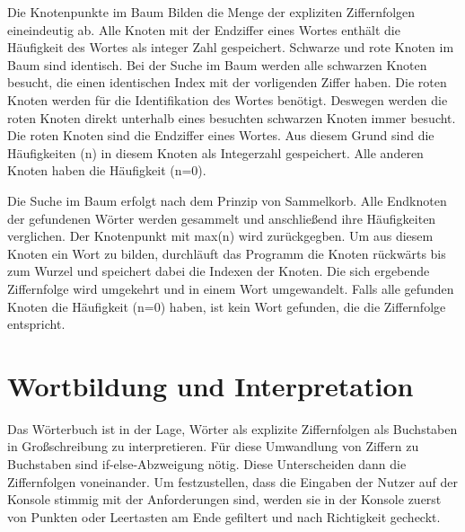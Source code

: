 Die Knotenpunkte im Baum Bilden die Menge der expliziten Ziffernfolgen eineindeutig ab. Alle Knoten mit der Endziffer eines Wortes enthält die Häufigkeit des Wortes als integer Zahl gespeichert.
Schwarze und rote Knoten im Baum sind identisch.
Bei der Suche im Baum werden alle schwarzen Knoten besucht, die einen identischen Index mit der vorligenden Ziffer haben. Die roten Knoten werden für die Identifikation des Wortes benötigt. Deswegen werden die roten Knoten direkt unterhalb eines besuchten schwarzen Knoten immer besucht. Die roten Knoten sind die Endziffer eines Wortes. Aus diesem Grund sind die Häufigkeiten (n) in diesem Knoten als Integerzahl gespeichert. Alle anderen Knoten haben die Häufigkeit (n=0).

Die Suche im Baum erfolgt nach dem Prinzip von Sammelkorb. Alle Endknoten der gefundenen Wörter werden gesammelt und anschließend ihre Häufigkeiten verglichen. Der Knotenpunkt mit max(n) wird zurückgegben.
Um aus diesem Knoten ein Wort zu bilden, durchläuft das Programm die Knoten rückwärts bis zum Wurzel und speichert dabei die Indexen der Knoten. Die sich ergebende Ziffernfolge wird umgekehrt und in einem Wort umgewandelt.
Falls alle gefunden Knoten die Häufigkeit (n=0) haben, ist kein Wort gefunden, die die Ziffernfolge entspricht.

\section{Wortbildung und Interpretation}
Das Wörterbuch ist in der Lage, Wörter als explizite Ziffernfolgen als Buchstaben in Großschreibung zu interpretieren.
Für diese Umwandlung von Ziffern zu Buchstaben sind if-else-Abzweigung nötig. Diese Unterscheiden dann die Ziffernfolgen voneinander.
Um festzustellen, dass die Eingaben der Nutzer auf der Konsole stimmig mit der Anforderungen sind, werden sie in der Konsole zuerst von Punkten oder Leertasten am Ende gefiltert und nach Richtigkeit gecheckt. 